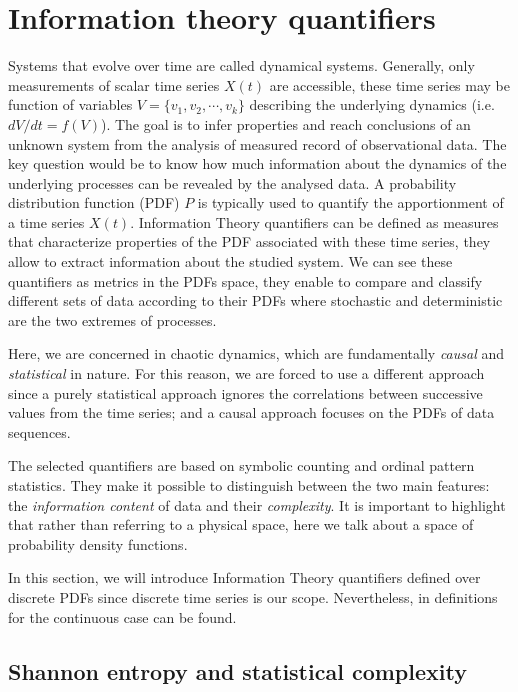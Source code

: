 \section{Information theory quantifiers}\label{sec:quanti}

Systems that evolve over time are called dynamical systems.
Generally, only measurements of scalar time series $X(t)$ are accessible, these time series may be function of variables $V=\{ v_1, v_2,\cdots, v_k\}$ describing the underlying dynamics (i.e. $dV/dt=f(V)$).
The goal is to infer properties and reach conclusions of an unknown system from the analysis of measured record of observational data.
The key question would be to know how much information about the dynamics of the underlying processes can be revealed by the analysed data.
A probability distribution function (PDF) $P$ is typically used to quantify the apportionment of a time series $X(t)$.
Information Theory quantifiers can be defined as measures that characterize properties of the PDF associated with these time series, they allow to extract information about the studied system.
We can see these quantifiers as metrics in the PDFs space, they enable to compare and classify different sets of data according to their PDFs where stochastic and deterministic are the two extremes of processes.

Here, we are concerned in chaotic dynamics, which are fundamentally \textit{causal} and \textit{statistical} in nature.
For this reason, we are forced to use a different approach since a purely statistical approach ignores the correlations between successive values from the time series; and a causal approach focuses on the PDFs of data sequences.

The selected quantifiers are based on symbolic counting and ordinal pattern statistics.
They make it possible to distinguish between the two main features: the \textit{information content} of data and their \textit{complexity}.
It is important to highlight that rather than referring to a physical space, here we talk about a space of probability density functions.

In this section, we will introduce Information Theory quantifiers defined over discrete PDFs since discrete time series is our scope.
Nevertheless, in \cite{Shannon1948} definitions for the continuous case can be found. 

\subsection{Shannon entropy and statistical complexity}

